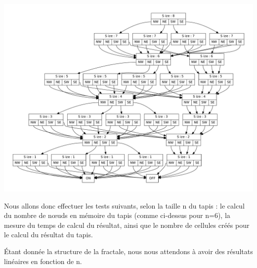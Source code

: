 \documentclass[a4paper,12pt]{report}
\begin{document}
\begin{center}
  \includegraphics[scale=0.40]{memCarpet6.pdf}
\end{center}

Nous allons donc effectuer les tests suivants, selon la taille n du
tapis : le calcul du nombre de n\oe uds en mémoire du tapis (comme
ci-dessus pour n=6), la mesure du temps de calcul du résultat, ainsi
que le nombre de cellules créés pour le calcul du résultat du tapis.

Étant donnée la structure de la fractale, nous nous attendons à avoir
des résultats linéaires en fonction de n.
\end{document}
